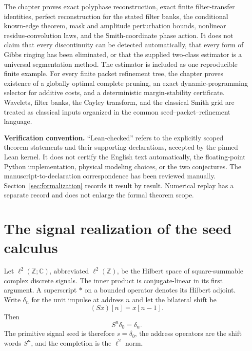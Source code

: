 \documentclass[11pt,letterpaper]{article}
\theoremstyle{plain}
\theoremstyle{plain}
\theoremstyle{plain}
\theoremstyle{definition}
\theoremstyle{definition}
\theoremstyle{definition}
\theoremstyle{definition}
\theoremstyle{remark}
\theoremstyle{remark}
\theoremstyle{remark}
\theoremstyle{remark}
\newcommand{\bbC}{\mathbb C}
\newcommand{\bbZ}{\mathbb Z}
\begin{document}
\begin{interpretation}[title={Scope and claim boundary}]
 The chapter proves exact polyphase reconstruction, exact finite filter-transfer identities, perfect reconstruction for the stated filter banks, the conditional known-edge theorem, mask and amplitude perturbation bounds, nonlinear residue-convolution laws, and the Smith-coordinate phase action. It does not claim that every discontinuity can be detected automatically, that every form of Gibbs ringing has been eliminated, or that the supplied two-class estimator is a universal segmentation method. The estimator is included as one reproducible finite example.  For every finite packet refinement tree, the chapter proves existence of a globally optimal complete pruning, an exact dynamic-programming selector for additive costs, and a deterministic margin-stability certificate. Wavelets, filter banks, the Cayley transform, and the classical Smith grid are treated as classical inputs organized in the common seed--packet--refinement language.
\end{interpretation}

\clearpage
\noindent\textbf{Verification convention.} ``Lean-checked'' refers to the explicitly scoped theorem statements and their supporting declarations, accepted by the pinned Lean kernel. It does not certify the English text automatically, the floating-point Python implementation, physical modeling choices, or the two conjectures. The manuscript-to-declaration correspondence has been reviewed manually. Section~\ref{sec:formalization} records it result by result. Numerical replay has a separate record and does not enlarge the formal theorem scope.



\section{The signal realization of the seed calculus}\label{core:section:01}

Let $\ell^2(\bbZ;\bbC)$, abbreviated $\ell^2(\bbZ)$, be the Hilbert space of square-summable complex discrete signals. The inner product is conjugate-linear in its first argument. A superscript $*$ on a bounded operator denotes its Hilbert adjoint. Write $\delta_n$ for the unit impulse at address $n$ and let the bilateral shift be
\[
(Sx)[n]=x[n-1].
\]
Then
\[
S^n\delta_0=\delta_n.
\]
The primitive signal seed is therefore $s=\delta_0$, the address operators are the shift words $S^n$, and the completion is the $\ell^2$ norm.
\end{document}
